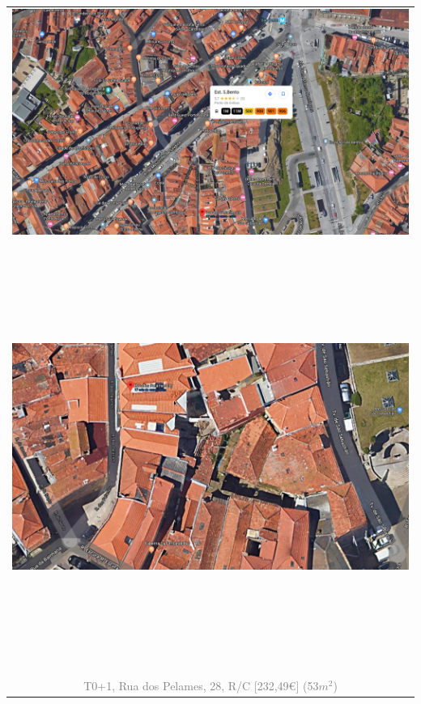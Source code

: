 \documentclass[]{report}
\begin{document}
\begin{table}[]
	\begin{center}
	\begin{huge}
	\begin{tabular}{c}
		\includegraphics[width=1\textwidth]{rua_dos_pelames_28_rc_sat} \\
		~\\
		~\\
		~\\
		~\\
		~\\
		\includegraphics[width=1\textwidth]{rua_dos_pelames_28_rc_str} \\
		~\\
		~\\
		~\\
		~\\
		~\\
		\textcolor{gray}{T0+1, Rua dos Pelames, 28, R/C [232,49€] (53$m^{2}$)}
	\end{tabular}
	\end{huge}
	\end{center}
\end{table}
\end{document}
